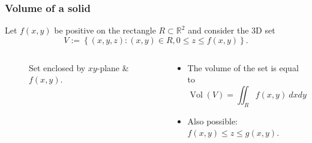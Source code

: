 \documentclass[aspectratio=169,handout]{beamer}
\newcommand{\bR}{\mathbb{R}} %
\begin{document}
\begin{frame}
    \frametitle{Volume of a solid}
    Let \(f(x,y)\) be positive on the rectangle \(R \subset \bR^2\) and consider the 3D set
    \[
        V := \left\{(x,y,z): (x,y)\in R, 0 \leq z \leq f(x,y)\right\}.
    \]

    \begin{columns}
        \begin{column}{.5\textwidth}
            \begin{figure}
                \caption{Set enclosed by \(xy\)-plane \& \(f(x,y)\).}
            \end{figure}
        \end{column}
        \begin{column}{.5\textwidth}

            \begin{itemize}
                \item  The volume of the set is equal to
                      \[
                          \operatorname{Vol}(V) = \iint_{R} f(x,y) \ dxdy.
                      \]
                \item Also possible: \(f(x,y)\leq z \leq g(x,y)\).
            \end{itemize}
        \end{column}
    \end{columns}
\end{frame}
\end{document}
